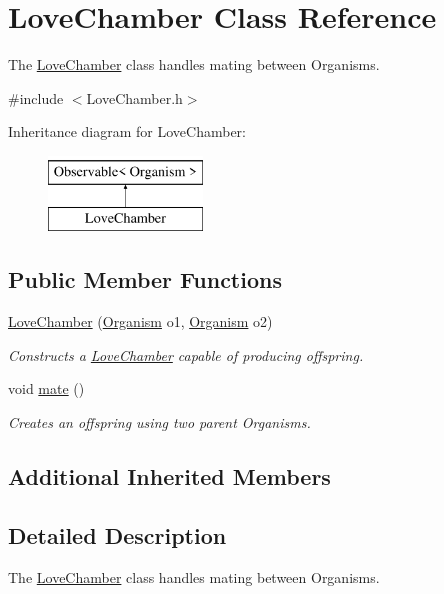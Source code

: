 \hypertarget{class_love_chamber}{}\section{Love\+Chamber Class Reference}
\label{class_love_chamber}


The \hyperlink{class_love_chamber}{Love\+Chamber} class handles mating between Organisms.  




{\ttfamily \#include $<$Love\+Chamber.\+h$>$}

Inheritance diagram for Love\+Chamber\+:\begin{figure}[H]
\begin{center}
\leavevmode
\includegraphics[height=2.000000cm]{class_love_chamber}
\end{center}
\end{figure}
\subsection*{Public Member Functions}
\begin{DoxyCompactItemize}
\item 
\hyperlink{class_love_chamber_afd8934456036b6252e0e968c26ffb04e}{Love\+Chamber} (\hyperlink{class_organism}{Organism} o1, \hyperlink{class_organism}{Organism} o2)
\begin{DoxyCompactList}\small\item\em Constructs a \hyperlink{class_love_chamber}{Love\+Chamber} capable of producing offspring. \end{DoxyCompactList}\item 
void \hyperlink{class_love_chamber_acdb1a279b4b6edfd8d38375c4faee182}{mate} ()
\begin{DoxyCompactList}\small\item\em Creates an offspring using two parent Organisms. \end{DoxyCompactList}\end{DoxyCompactItemize}
\subsection*{Additional Inherited Members}


\subsection{Detailed Description}
The \hyperlink{class_love_chamber}{Love\+Chamber} class handles mating between Organisms. 

